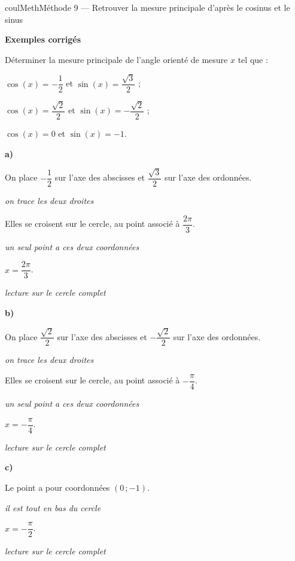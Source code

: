 \documentclass[11pt,a4paper]{article}
\makeatletter
\newcounter{lycee@signet}
\newcommand{\signet}[3][]{\stepcounter{lycee@signet}%
  \edef\lycee@dest{\if\relax\detokenize{#1}\relax
    signet.\arabic{lycee@signet}\else#1\fi}%
  \hypertarget{\lycee@dest}{}\bookmark[level=#2,dest=\lycee@dest]{#3}}
\newcommand{\res}[1]{#1}
\newcounter{methode}
\newenvironment{methodebox}[1][Méthode]{\stepcounter{methode}%
  \begin{boitecours}[phantom={\signet[methode-\arabic{methode}]{2}{#1}}]{coulMeth}{#1}}%
  {\end{boitecours}}
\newcommand{\etape}[1]{\par\smallskip\textbf{\color{coulMeth}#1}\par\nobreak\smallskip}
\newcommand{\explique}[2]{\par\smallskip\noindent
  \begin{minipage}[t]{0.57\linewidth}\raggedright #1\end{minipage}\hfill
  \begin{minipage}[t]{0.40\linewidth}\raggedright\leavevmode
    {\small\itshape\color{black!60}#2}\end{minipage}\par}
\newcommand{\cas}[1]{\par\smallskip\noindent\textbf{\color{coulExo}#1}\vadjust{\nobreak}}
\newenvironment{correction}{\par}{\par}
\newcommand{\etapeexemples}{\etape{Exemples corrigés}}
\makeatother
\begin{document}
\begin{methodebox}[Méthode 9 --- Retrouver la mesure principale d'après le cosinus et le sinus]
\etapeexemples
Déterminer la mesure principale de l'angle orienté de mesure $x$ tel que :
\begin{questions}[label=\alph*)]
  \item $\cos(x)=-\dfrac{1}{2}$ et $\sin(x)=\dfrac{\sqrt{3}}{2}$ ;
  \item $\cos(x)=\dfrac{\sqrt{2}}{2}$ et $\sin(x)=-\dfrac{\sqrt{2}}{2}$ ;
  \item $\cos(x)=0$ et $\sin(x)=-1$.
\end{questions}
\begin{correction}
\cas{a)}\par\nopagebreak
\begin{minipage}[c]{0.68\linewidth}\raggedright
\explique{On place $-\dfrac{1}{2}$ sur l'axe des abscisses et $\dfrac{\sqrt{3}}{2}$ sur l'axe des ordonnées.}{on trace les deux droites}
\explique{Elles se croisent sur le cercle, au point associé à $\dfrac{2\pi}{3}$.}{un seul point a ces deux coordonnées}
\explique{$x=\res{\dfrac{2\pi}{3}}$.}{lecture sur le cercle complet}
\end{minipage}\hfill
\begin{minipage}[c]{0.28\linewidth}\centering
{}
\end{minipage}
\cas{b)}\par\nopagebreak
\begin{minipage}[c]{0.68\linewidth}\raggedright
\explique{On place $\dfrac{\sqrt{2}}{2}$ sur l'axe des abscisses et $-\dfrac{\sqrt{2}}{2}$ sur l'axe des ordonnées.}{on trace les deux droites}
\explique{Elles se croisent sur le cercle, au point associé à $-\dfrac{\pi}{4}$.}{un seul point a ces deux coordonnées}
\explique{$x=\res{-\dfrac{\pi}{4}}$.}{lecture sur le cercle complet}
\end{minipage}\hfill
\begin{minipage}[c]{0.28\linewidth}\centering
{}
\end{minipage}
\cas{c)}\par\nopagebreak
\begin{minipage}[c]{0.68\linewidth}\raggedright
\explique{Le point a pour coordonnées $(0\,;-1)$.}{il est tout en bas du cercle}
\explique{$x=\res{-\dfrac{\pi}{2}}$.}{lecture sur le cercle complet}
\end{minipage}\hfill
\begin{minipage}[c]{0.28\linewidth}\centering
{}
\end{minipage}
\end{correction}


\end{methodebox}
\end{document}
